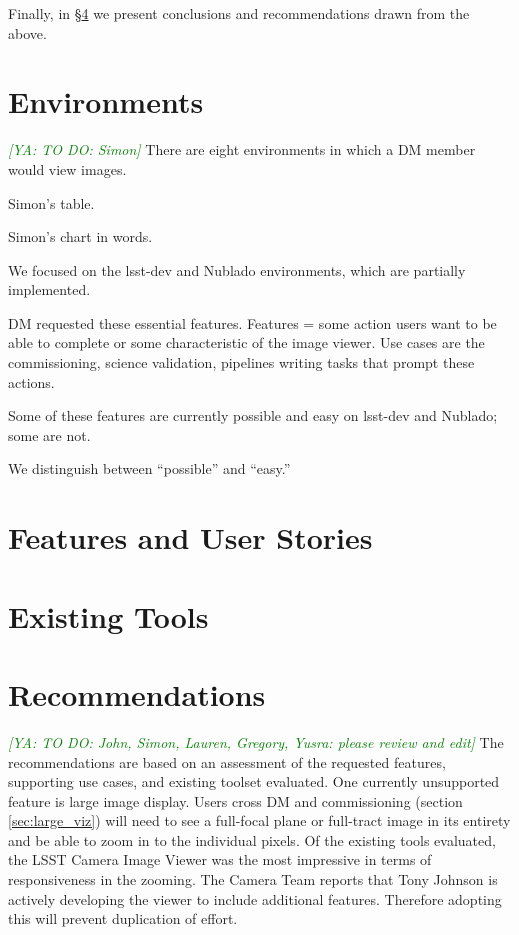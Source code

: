 \documentclass[DM,authoryear,toc]{lsstdoc}
\newcommand{\yusra}[1]{{\it \textcolor{green}{[YA: #1]}}}
\begin{document}
Finally, in \S\ref{sec:conc} we present conclusions and recommendations drawn from the above.

\section{Environments}
\label{sec:env}
\yusra{TO DO: Simon}
There are eight environments in which a DM member would view images.

Simon's table.

Simon's chart in words.

We focused on the lsst-dev and Nublado environments, which are partially implemented.

DM requested these essential features.
Features = some action users want to be able to complete or some characteristic of the image viewer.
Use cases are the commissioning,  science validation, pipelines writing tasks that prompt these actions.

Some of these features are currently possible and easy on lsst-dev and Nublado; some are not.

We distinguish between ``possible'' and ``easy.''

\section{Features and User Stories}
\label{sec:features}


\section{Existing Tools}
\label{sec:tools}


\section{Recommendations}
\label{sec:conc}

\yusra{TO DO: John, Simon, Lauren, Gregory, Yusra: please review and edit}
The recommendations are based on an assessment of the requested features, supporting use cases, and existing toolset evaluated.
One currently unsupported feature is large image display.
Users cross DM and commissioning (section \ref{sec:large_viz}) will need to see a full-focal plane or full-tract image in its entirety and be able to zoom in to the individual pixels.
Of the existing tools evaluated, the LSST Camera Image Viewer was the most impressive in terms of responsiveness in the zooming.
The Camera Team reports that Tony Johnson is actively developing the viewer to include additional features.
Therefore adopting this will prevent duplication of effort.
\end{document}

